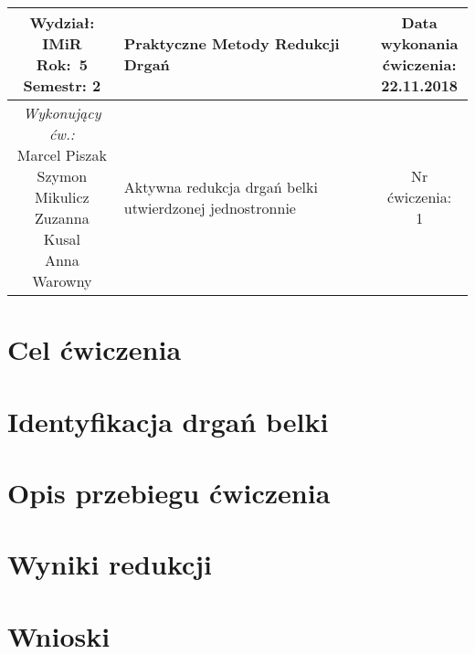\documentclass[polish,a4paper,11pt]{mwart}
\let\Oldsection\section
\renewcommand{\section}{\FloatBarrier\Oldsection}
\begin{document}
	\begin{table}[h] %
	\centering
		\begin{tabular}{ | c |  >{\centering\arraybackslash}m{5.5cm} | c | }
			\hline
			\makecell{ \textbf{Wydział:} \\ IMiR \\ \textbf{Rok:}~5 \\ Semestr: 2 } &
			\textbf{\large{Praktyczne Metody Redukcji Drgań}} &
			\makecell{Data \\ wykonania \\ ćwiczenia: \\ 22.11.2018} \\ \hline
      \makecell{\emph{Wykonujący ćw.:} \\ Marcel Piszak \\ Szymon Mikulicz \\ Zuzanna Kusal \\ Anna Warowny} &
			\large{Aktywna redukcja drgań belki utwierdzonej jednostronnie} &
			\makecell{Nr ćwiczenia: \\ 1} \\ \hline
		\end{tabular}
	\end{table}

  \section{Cel ćwiczenia}

  \section{Identyfikacja drgań belki}

  \section{Opis przebiegu ćwiczenia}

  \section{Wyniki redukcji}

  \section{Wnioski}
\end{document}
